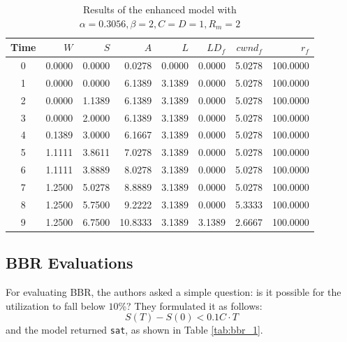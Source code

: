 \documentclass[12pt]{l4dc2023}
\begin{document}
\begin{table}[htbp]
\centering
\begin{tabular}{|c|r|r|r|r|r|r|r|}
\hline
\textbf{Time} & \textbf{$W$} & \textbf{$S$} & \textbf{$A$} & \textbf{$L$} & \textbf{$LD_f$} & \textbf{$cwnd_f$} & \textbf{$r_f$} \\
\hline
0 & 0.0000 & 0.0000 & 0.0278 & 0.0000 & 0.0000 & 5.0278 & 100.0000 \\
1 & 0.0000 & 0.0000 & 6.1389 & 3.1389 & 0.0000 & 5.0278 & 100.0000 \\
2 & 0.0000 & 1.1389 & 6.1389 & 3.1389 & 0.0000 & 5.0278 & 100.0000 \\
3 & 0.0000 & 2.0000 & 6.1389 & 3.1389 & 0.0000 & 5.0278 & 100.0000 \\
4 & 0.1389 & 3.0000 & 6.1667 & 3.1389 & 0.0000 & 5.0278 & 100.0000 \\
5 & 1.1111 & 3.8611 & 7.0278 & 3.1389 & 0.0000 & 5.0278 & 100.0000 \\
6 & 1.1111 & 3.8889 & 8.0278 & 3.1389 & 0.0000 & 5.0278 & 100.0000 \\
7 & 1.2500 & 5.0278 & 8.8889 & 3.1389 & 0.0000 & 5.0278 & 100.0000 \\
8 & 1.2500 & 5.7500 & 9.2222 & 3.1389 & 0.0000 & 5.3333 & 100.0000 \\
9 & 1.2500 & 6.7500 & 10.8333 & 3.1389 & 3.1389 & 2.6667 & 100.0000 \\
\hline
\end{tabular}
\caption{Results of the enhanced model with $\alpha=0.3056, \beta=2, C=D=1, R_m=2$}
\label{tab:aimd_4}
\end{table}

\subsection{BBR Evaluations}

For evaluating BBR, the authors asked a simple question: is it possible for the utilization to fall below $10$\%? They formulated it as follows:
\[
S(T) - S(0) < 0.1C \cdot T
\]
and the model returned \texttt{sat}, as shown in Table \ref{tab:bbr_1}.
\end{document}
